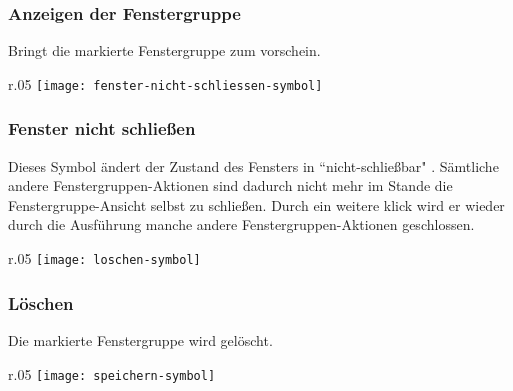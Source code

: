 \subsubsection{Anzeigen der Fenstergruppe}

\vspace{10pt}

Bringt die markierte Fenstergruppe zum vorschein.\\

\newpage

\begin{wrapfigure}{r}{.05\textwidth}
	\vspace{-14pt}
	\texttt{[image: fenster-nicht-schliessen-symbol]}
	\vspace{-35pt}
\end{wrapfigure}

\subsubsection{Fenster nicht schließen}

\vspace{10pt}

Dieses Symbol ändert der Zustand des Fensters in ``nicht-schließbar" \hspace{1pt}. Sämtliche andere Fenstergruppen-Aktionen sind dadurch nicht mehr im Stande die Fenstergruppe-Ansicht selbst zu schließen. Durch ein weitere klick wird er wieder durch die Ausführung manche andere Fenstergruppen-Aktionen geschlossen.\\

\begin{wrapfigure}{r}{.05\textwidth}
	\vspace{-14pt}
	\texttt{[image: loschen-symbol]}
	\vspace{-35pt}
\end{wrapfigure}

\subsubsection{Löschen}

\vspace{10pt}

\noindent
Die markierte Fenstergruppe wird gelöscht.\\

\begin{wrapfigure}{r}{.05\textwidth}
	\vspace{-14pt}
	\texttt{[image: speichern-symbol]}
	\vspace{-35pt}
\end{wrapfigure}

